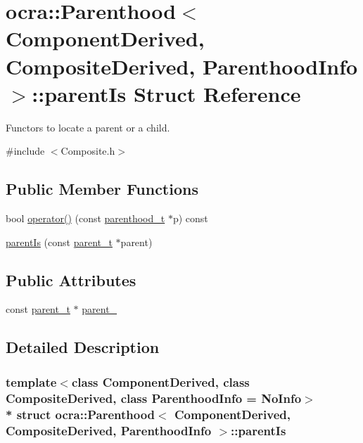 \hypertarget{structocra_1_1Parenthood_1_1parentIs}{}\section{ocra\+:\+:Parenthood$<$ Component\+Derived, Composite\+Derived, Parenthood\+Info $>$\+:\+:parent\+Is Struct Reference}
\label{structocra_1_1Parenthood_1_1parentIs}


Functors to locate a parent or a child.  




{\ttfamily \#include $<$Composite.\+h$>$}

\subsection*{Public Member Functions}
\begin{DoxyCompactItemize}
\item 
bool \hyperlink{structocra_1_1Parenthood_1_1parentIs_a3d35715bf98b5c3fed6dbb60791fcc13}{operator()} (const \hyperlink{classocra_1_1Parenthood_acdae20cb747190b5dc9dbe42290bde78}{parenthood\+\_\+t} $\ast$p) const 
\item 
\hyperlink{structocra_1_1Parenthood_1_1parentIs_ada25b4ec30bebc7ca18b9c548e27a94f}{parent\+Is} (const \hyperlink{classocra_1_1Parenthood_a2f95265c57cf96bbc26afee2ac757dd6}{parent\+\_\+t} $\ast$parent)
\end{DoxyCompactItemize}
\subsection*{Public Attributes}
\begin{DoxyCompactItemize}
\item 
const \hyperlink{classocra_1_1Parenthood_a2f95265c57cf96bbc26afee2ac757dd6}{parent\+\_\+t} $\ast$ \hyperlink{structocra_1_1Parenthood_1_1parentIs_a1c5033667c6742b8f4ba326918eb1f4d}{parent\+\_\+}
\end{DoxyCompactItemize}


\subsection{Detailed Description}
\subsubsection*{template$<$class Component\+Derived, class Composite\+Derived, class Parenthood\+Info = No\+Info$>$\\*
struct ocra\+::\+Parenthood$<$ Component\+Derived, Composite\+Derived, Parenthood\+Info $>$\+::parent\+Is}

